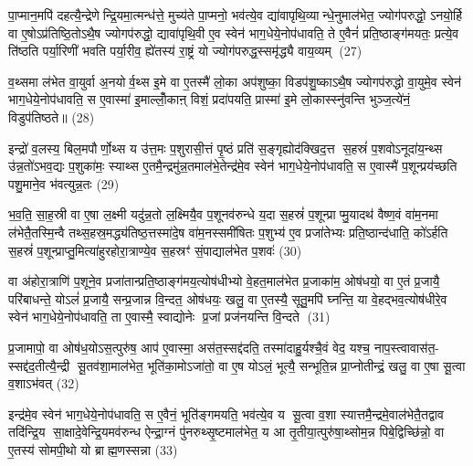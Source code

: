 पा॒प्मान॒मपि॑ दहत्यै॒न्द्रेणेन्द्रि॒यमा॒त्मन्ध॑त्ते॒ मुच्य॑ते पा॒प्मनो॒ भव॑त्ये॒व द्या॑वापृथि॒व्यान्धे॒नुमाल॑भेत॒ ज्योग॑परुद्धो॒ ऽनयो॒र्\mbox{}हि वा ए॒षोऽप्र॑तिष्ठि॒तोऽथै॒ष ज्योगप॑रुद्धो॒ द्यावा॑पृथि॒वी ए॒व स्वेन॑ भाग॒धेये॒नोप॑धावति॒ ते ए॒वैनं॑ प्रति॒ष्ठाङ्ग॑मयतः॒ प्रत्ये॒व ति॑ष्ठति पर्या॒रिणी॑ भवति पर्या॒रीव॒ ह्ये॑तस्य॑ रा॒ष्ट्रं यो ज्योग॑परुद्ध॒स्समृ॑द्ध्यै वाय॒व्यम् (27)

व॒थ्समा ल॑भेत वा॒युर्वा अ॒नयोर्व॒थ्स इ॒मे वा ए॒तस्मै॑ लो॒का अप॑शुष्का॒ विडप॑शु॒ष्काऽथै॒ष ज्योगप॑रुद्धो वा॒युमे॒व स्वेन॑ भाग॒धेये॒नोप॑धावति॒ स ए॒वास्मा॑ इ॒माल्लोँ॒काऩ् विशं॒ प्रदा॑पयति॒ प्रास्मा॑ इ॒मे लो॒कास्स्नु॑वन्ति भुञ्ज॒त्ये॑नं॒ विडुप॑तिष्ठते॥ (28)

{\anuvakamend[{म॒द्ध्यन्दि॑ने॒ कद्रुं॑ य॒मस्य॒ स्पर्द्ध॑मानो वैष्णावरु॒णीन्तमिन्द्रोऽस्य॒ स्वेन॑ भाग॒धेये॒नोप॑सृतो वाय॒व्य॑न्द्विच॑त्वारिशच्च। (4)।}]}

इन्द्रो॑ व॒लस्य॒ बिल॒मपौर्णो॒थ्स य उ॑त्त॒मः प॒शुरासी॒त्तं पृ॒ष्ठं प्रति॑ स॒ङ्गृह्योद॑क्खिद॒त्त स॒हस्रं॑ प॒शवोऽनूदा॑य॒न्थ्स उ॑न्न॒तो॑ऽभव॒द्यः प॒शुका॑मः॒ स्याथ्स ए॒तमै॒न्द्रमु॑न्न॒तमाल॑भे॒तेन्द्र॑मे॒व स्वेन॑ भाग॒धेये॒नोप॑धावति॒ स ए॒वास्मै॑ प॒शून्प्रय॑च्छति पशु॒माने॒व भ॑वत्युन्न॒तः (29)

भ॒व॒ति॒ सा॒ह॒स्री वा ए॒षा ल॒क्ष्मी यदु॑न्न॒तो ल॒क्ष्मियै॒व प॒शूनव॑रुन्धे य॒दा स॒हस्रं॑ प॒शून्प्राप्मु॒यादथ॑ वैष्ण॒वं वा॑म॒नमा ल॑भेतै॒तस्मि॒न्वै तथ्स॒हस्र॒मद्ध्य॑तिष्ठ॒त्तस्मा॑दे॒ष वा॑म॒नस्समी॑षितः प॒शुभ्य॑ ए॒व प्रजा॑तेभ्यः प्रति॒ष्ठान्द॑धाति॒ को॑ऽर्\mbox{}हति स॒हस्रं॑ प॒शून्प्राप्तु॒मित्या॑हुरहोरा॒त्राण्ये॒व स॒हस्रꣳ॑ सं॒पाद्याल॑भेत प॒शवः॑ (30)

वा अ॑होरा॒त्राणि॑ प॒शूने॒व प्रजा॑तान्प्रति॒ष्ठाङ्ग॑मय॒त्योष॑धीभ्यो वे॒हत॒माल॑भेत प्र॒जाका॑म॒ ओष॑धयो॒ वा ए॒तं प्र॒जायै॒ परि॑बाधन्ते॒ योऽलं॑ प्र॒जायै॒ सन्प्र॒जान्न वि॒न्दत॒ ओष॑धयः॒ खलु॒ वा ए॒तस्यै॒ सूतु॒मपि॑ घ्नन्ति॒ या वे॒हद्भव॒त्योष॑धीरे॒व स्वेन॑ भाग॒धेये॒नोप॑धावति॒ ता ए॒वास्मै॒ स्वाद्योनेः प्र॒जां प्रज॑नयन्ति वि॒न्दते (31)

प्र॒जामापो॒ वा ओष॑ध॒योऽस॒त्पुरु॑ष॒ आप॑ ए॒वास्मा॒ अस॑त॒स्सद्द॑दति॒ तस्मा॑दाहु॒र्यश्चै॒वं वेद॒ यश्च॒ नाप॒स्त्वावास॑त॒- स्सद्द॑द॒तीत्यै॒न्द्री सू॒तव॑शा॒माल॑भेत॒ भूति॑का॒मोऽजा॑तो॒ वा ए॒ष योऽलं॒ भूत्यै॒ सन्भूति॒न्न प्रा॒प्नोतीन्द्रं॒ खलु॒ वा ए॒षा सू॒त्वा व॒शाऽभ॑वत् (32)

इन्द्र॑मे॒व स्वेन॑ भाग॒धेये॒नोप॑धावति॒ स ए॒वैनं॒ भूति॑ङ्गमयति॒ भव॑त्ये॒व य सू॒त्वा व॒शा स्यात्तमै॒न्द्रमे॒वाल॑भेतै॒तद्वाव तदि॑न्द्रि॒य सा॒क्षादे॒वेन्द्रि॒यमव॑रुन्ध ऐन्द्रा॒ग्नं पु॑नरुथ्सृ॒ष्टमाल॑भेत॒ य आ तृ॒तीया॒त्पुरु॑षा॒थ्सोम॒न्न पिबे॒द्विच्छि॑न्नो॒ वा ए॒तस्य॑ सोमपी॒थो यो ब्राह्म॒णस्सन्ना (33)

